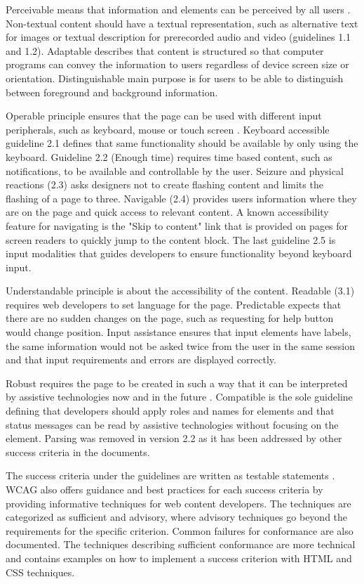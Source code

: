 

Perceivable means that information and elements can be perceived by all users \citep{wcag22}. Non-textual content should have a textual representation, such as alternative text for images or textual description for prerecorded audio and video (guidelines 1.1 and 1.2). Adaptable describes that content is structured so that computer programs can convey the information to users regardless of device screen size or orientation. Distinguishable main purpose is for users to be able to distinguish between foreground and background information.

Operable principle ensures that the page can be used with different input peripherals, such as keyboard, mouse or touch screen \cite{wcag22}. Keyboard accessible guideline 2.1 defines that same functionality should be available by only using the keyboard. Guideline 2.2 (Enough time) requires time based content, such as notifications, to be available and controllable by the user. Seizure and physical reactions (2.3) asks designers not to create flashing content and limits the flashing of a page to three. Navigable (2.4) provides users information where they are on the page and quick access to relevant content. A known accessibility feature for navigating is the "Skip to content" link that is provided on pages for screen readers to quickly jump to the content block. The last guideline 2.5 is input modalities that guides developers to ensure functionality beyond keyboard input.

Understandable principle is about the accessibility of the content. Readable (3.1) requires web developers to set language for the page. Predictable expects that there are no sudden changes on the page, such as requesting for help button would change position. Input assistance ensures that input elements have labels, the same information would not be asked twice from the user in the same session and that input requirements and errors are displayed correctly. 

Robust requires the page to be created in such a way that it can be interpreted by assistive technologies now and in the future \citep{wcag22}. Compatible is the sole guideline defining that developers should apply roles and names for elements and that status messages can be read by assistive technologies without focusing on the element. Parsing was removed in version 2.2 as it has been addressed by other success criteria in the documents.

The success criteria under the guidelines are written as testable statements \citep{wcag22}. WCAG also offers guidance and best practices for each success criteria by providing informative techniques for web content developers. The techniques are categorized as sufficient and advisory, where advisory techniques go beyond the requirements for the specific criterion. Common failures for conformance are also documented. The techniques describing sufficient conformance are more technical and contains examples on how to implement a success criterion with HTML and CSS techniques. 

